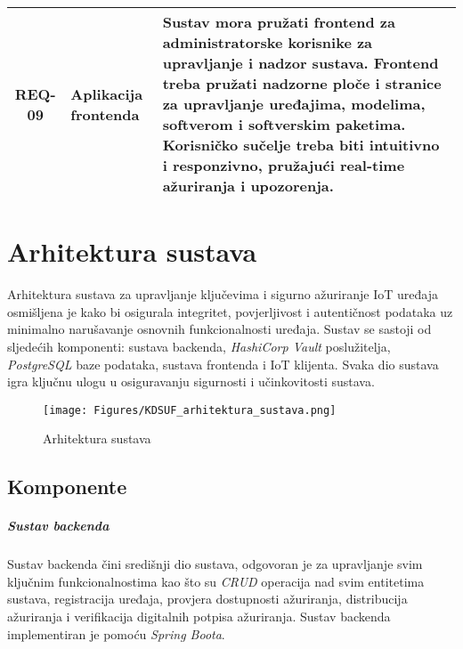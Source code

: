 \documentclass[zavrsnirad]{fer}
\begin{document}
\begin{longtable}{|c|p{4cm}|p{8cm}|}
		\hline
		REQ-09 & Aplikacija frontenda & Sustav mora pružati frontend za administratorske korisnike za upravljanje i nadzor sustava. Frontend treba pružati nadzorne ploče i stranice za upravljanje uređajima, modelima, softverom i softverskim paketima. Korisničko sučelje treba biti intuitivno i responzivno, pružajući real-time ažuriranja i upozorenja. \\
		\hline
	\end{longtable}
	\normalsize
	
	
	\chapter{Arhitektura sustava}
	\label{pog:arhitektura_sustava}
	
	Arhitektura sustava za upravljanje ključevima i sigurno ažuriranje IoT uređaja osmišljena je kako bi osigurala integritet, povjerljivost i autentičnost podataka uz minimalno narušavanje osnovnih funkcionalnosti uređaja. Sustav se sastoji od sljedećih komponenti: sustava backenda, \textit{HashiCorp Vault} poslužitelja, \textit{PostgreSQL} baze podataka, sustava frontenda i IoT klijenta. Svaka dio sustava igra ključnu ulogu u osiguravanju sigurnosti i učinkovitosti sustava.
	
	\begin{figure}[htb]
		\centering
		\texttt{[image: Figures/KDSUF\_arhitektura\_sustava.png]} 
		\caption{Arhitektura sustava}
		\label{slk:arhitektura_sustava}
	\end{figure}
	
	\section{Komponente}
	\label{arh_sus:komponente}
	
	\paragraph{Sustav backenda}
	\label{arh_sus:backend_servis}
	 Sustav backenda čini središnji dio sustava, odgovoran je za upravljanje svim ključnim funkcionalnostima kao što su \textit{CRUD} operacija nad svim entitetima sustava, registracija uređaja, provjera dostupnosti ažuriranja, distribucija ažuriranja i verifikacija digitalnih potpisa ažuriranja. Sustav backenda implementiran je pomoću \textit{Spring Boota}. 
	
\end{document}
